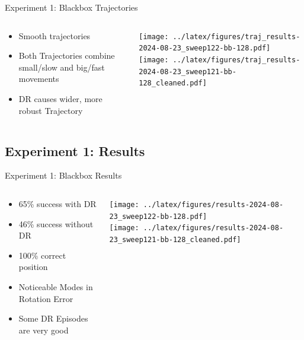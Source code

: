 \documentclass[16:9,en,navbarinfooter]{sdqbeamer}
\begin{document}
\begin{frame}{Experiment 1: Blackbox Trajectories}

	\begin{columns}[t]
		\begin{column}{0.3\textwidth}
			\vspace{1cm}
			\begin{itemize}
				\item Smooth trajectories
				\item Both Trajectories combine small/slow and big/fast movements
				\item DR causes wider, more robust Trajectory
			\end{itemize}
		\end{column}
		\begin{column}{0.7\textwidth}
			\vspace{1cm}
			\texttt{[image: ../latex/figures/traj\_results-2024-08-23\_sweep122-bb-128.pdf]}\\
			\texttt{[image: ../latex/figures/traj\_results-2024-08-23\_sweep121-bb-128\_cleaned.pdf]}\\
		\end{column}
	\end{columns}
\end{frame}


\subsection{Experiment 1: Results}
\begin{frame}{Experiment 1: Blackbox Results}

	\begin{columns}[t]
		\begin{column}{0.3\textwidth}
			\vspace{1cm}
			\begin{itemize}
				\item 65\% success with DR
				\item 46\% success without DR
				\item 100\% correct position
				\item Noticeable Modes in Rotation Error
				\item Some DR Episodes are very good
			\end{itemize}
		\end{column}
		\begin{column}{0.7\textwidth}
			\vspace{1cm}
			\texttt{[image: ../latex/figures/results-2024-08-23\_sweep122-bb-128.pdf]} \\
			\texttt{[image: ../latex/figures/results-2024-08-23\_sweep121-bb-128\_cleaned.pdf]}\\
		\end{column}
	\end{columns}
\end{frame}
\end{document}
